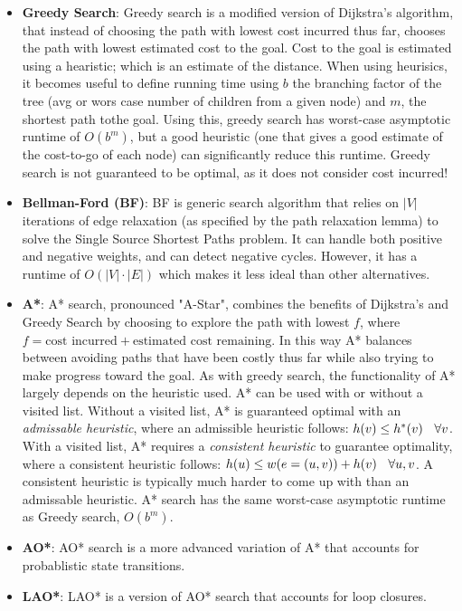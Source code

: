 \documentclass{article}
\begin{document}
\begin{itemize}
    \item \textbf{Greedy Search}: Greedy search is a modified version of Dijkstra's algorithm, that instead of choosing the path with lowest cost incurred thus far, chooses the path with lowest estimated cost to the goal. Cost to the goal is estimated using a hearistic; which is an estimate of the distance. When using heurisics, it becomes useful to define running time using $b$ the branching factor of the tree (avg or wors case number of children from a given node) and $m$, the shortest path tothe goal. Using this, greedy search has worst-case asymptotic runtime of $O(b^m)$, but a good heuristic (one that gives a good estimate of the cost-to-go of each node) can significantly reduce this runtime. Greedy search is not guaranteed to be optimal, as it does not consider cost incurred!
    \item \textbf{Bellman-Ford (BF)}: BF is generic search algorithm that relies on $|V|$ iterations of edge relaxation (as specified by the path relaxation lemma) to solve the Single Source Shortest Paths problem. It can handle both positive and negative weights, and can detect negative cycles. However, it has a runtime of $O(|V|\cdot |E|)$ which makes it less ideal than other alternatives. 
    \item \textbf{A*}: A* search, pronounced "A-Star", combines the benefits of Dijkstra's and Greedy Search by choosing to explore the path with lowest $f$, where $f=\textrm{cost incurred} + \textrm{estimated cost remaining}$. In this way A* balances between avoiding paths that have been costly thus far while also trying to make progress toward the goal. As with greedy search, the functionality of A* largely depends on the heuristic used. A* can be used with or without a visited list. Without a visited list, A* is guaranteed optimal with an \textit{admissable heuristic}, where an admissible heuristic follows: $h(v) \leq h^*(v)\ \hspace{2mm} \forall v$. With a visited list, A* requires a \textit{consistent heuristic} to guarantee optimality, where a consistent heuristic follows: $h(u) \leq w(e=(u,v)) + h(v)\ \hspace{2mm}\forall u,v$. A consistent heuristic is typically much harder to come up with than an admissable heuristic. A* search has the same worst-case asymptotic runtime as Greedy search, $O(b^m)$. 
    \item \textbf{AO*}: AO* search is a more advanced variation of A* that accounts for probablistic state transitions. 
    \item \textbf{LAO*}: LAO* is a version of AO* search that accounts for loop closures. 
\end{itemize}
\end{document}

